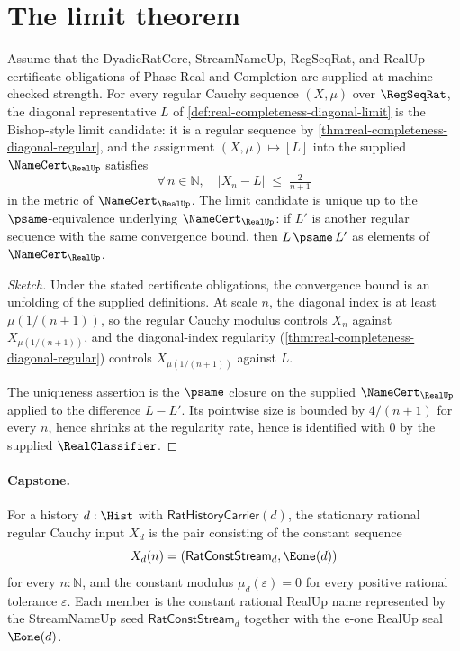 \section{The limit theorem}
\label{sec:real-completeness-limit-theorem}

\begin{theorem}
\label{thm:real-completeness-limit-exists-unique}
Assume that the DyadicRatCore, StreamNameUp, RegSeqRat, and RealUp certificate obligations of Phase Real and Completion are supplied at machine-checked strength. For every regular Cauchy sequence $(X, \mu)$ over $\RegSeqRat$, the diagonal representative $L$ of \autoref{def:real-completeness-diagonal-limit} is the Bishop-style limit candidate: it is a regular sequence by \autoref{thm:real-completeness-diagonal-regular}, and the assignment $(X, \mu) \mapsto [L]$ into the supplied $\NameCert_{\RealUp}$ satisfies
$$ \forall\, n \in \mathbb{N}, \quad |X_n - L| \;\le\; \tfrac{2}{n+1} $$
in the metric of $\NameCert_{\RealUp}$. The limit candidate is unique up to the $\psame$-equivalence underlying $\NameCert_{\RealUp}$: if $L'$ is another regular sequence with the same convergence bound, then $L \,\psame\, L'$ as elements of $\NameCert_{\RealUp}$.
\end{theorem}

\begin{proof}[Sketch]
Under the stated certificate obligations, the convergence bound is an unfolding of the supplied definitions. At scale $n$, the diagonal index is at least $\mu(1/(n+1))$, so the regular Cauchy modulus controls $X_n$ against $X_{\mu(1/(n+1))}$, and the diagonal-index regularity (\autoref{thm:real-completeness-diagonal-regular}) controls $X_{\mu(1/(n+1))}$ against $L$.

The uniqueness assertion is the $\psame$ closure on the supplied $\NameCert_{\RealUp}$ applied to the difference $L - L'$. Its pointwise size is bounded by $4/(n+1)$ for every $n$, hence shrinks at the regularity rate, hence is identified with $0$ by the supplied $\RealClassifier$.
\end{proof}

\paragraph{Capstone.}
\begin{definition}
\label{def:real-completeness-stationary-rational-cauchy}
For a history $d:\Hist$ with $\mathsf{RatHistoryCarrier}(d)$, the stationary rational regular Cauchy input $X_d$ is the pair consisting of the constant sequence
$$
X_d(n)=(\mathsf{RatConstStream}_d,\Eone(d))
$$
for every $n:\mathbb{N}$, and the constant modulus $\mu_d(\varepsilon)=0$ for every positive rational tolerance $\varepsilon$. Each member is the constant rational RealUp name represented by the StreamNameUp seed $\mathsf{RatConstStream}_d$ together with the e-one RealUp seal $\Eone(d)$.
\end{definition}

